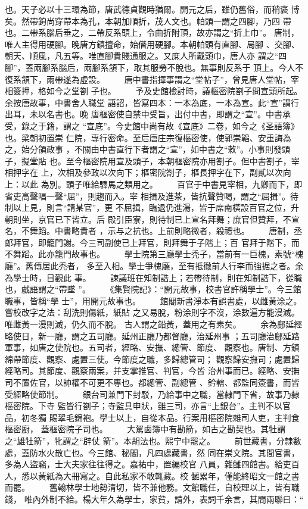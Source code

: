 \documentclass{ctexart}
\begin{document}
也。天子必以十三環為節，唐武德貞觀時猶爾。開元之后，雖仍舊俗，而稍褒 博矣。然帶鉤尚穿帶本為孔，本朝加順折，茂人文也。帕頭一謂之四腳，乃四 帶也。二帶系腦后垂之，二帶反系頭上，令曲折附頂，故亦謂之``折上巾''。 唐制，唯人主得用硬腳。晚唐方鎮擅命，始僭用硬腳。本朝帕頭有直腳、局腳 、交腳、朝天、順風，凡五等。唯直腳貴賤通服之。又庶人所戴頭巾，唐人亦 謂之``四腳''，蓋兩腳系腦后，兩腳系頷下，取其服勞不脫也。無事則反系于 頂上。今人不復系頷下，兩帶遂為虛設。 　　唐中書指揮事謂之``堂帖子''，曾見唐人堂帖，宰相簽押，格如今之堂劄 子也。 　　予及史館檢討時，議樞密院劄子問宣頭所起。余按唐故事，中書舍人職堂 語詔，皆寫四本：一本為底，一本為宣。此``宣''謂行出耳，未以名書也。晚 唐樞密使自禁中受旨，出付中書，即謂之``宣''。中書承受，錄之于籍，謂之 ``宣底''。今史館中尚有故《宣底》二卷，如今之《圣語簿》也。梁朝初置崇 仁院，專行密命。至后唐庄宗復樞密使，使郭崇韜、安重誨為之，始分領政事 ，不關由中書直行下者謂之``宣''，如中書之``敕''。小事則發頭子，擬堂貼 也。至今樞密院用宣及頭子，本朝樞密院亦用劄子。但中書劄子，宰相押字在 上，次相及參政以次向下；樞密院劄子，樞長押字在下，副貳以次向上：以此 為別。頭子唯給驛馬之類用之。 　　百官于中書見宰相，九卿而下，即省吏高聲唱一聲``屈''，則趨而入。宰 相揖及進茶，皆抗聲贊喝，謂之``屈揖''。待制以上見，則言``請某官''，更 不屈揖，臨退仍進湯，皆于席南橫設百官之位，升朝則坐，京官已下皆立。后 殿引臣寮，則待制已上宣名拜舞；庶官但贊拜，不宣名，不舞蹈。中書略貴者 ，示与之抗也。上前則略微者，殺禮也。 　　唐制，丞郎拜官，即籠門謝。今三司副使已上拜官，則拜舞于子階上；百 官拜于階下，而不舞蹈。此亦籠門故事也。 　　學士院第三廳學士秃子，當前有一巨槐，素號``槐廳''。舊傳居此秃者， 多至入相。學士爭槐廳，至有抵徹前人行李而強据之者。余為學士時，目觀此 事。 　　諫議班在知制誥上；若帶待制，則在知制誥下，從職也，戲語謂之``帶墜 ''。 　　《集賢院記》：``開元故事，校書官許稱學士''。今三館職事，皆稱``學 士''，用開元故事也。 　　館閣新書淨本有誤書處，以雌黃涂之。嘗校改字之法：刮洗則傷紙，紙貼 之又易脫，粉涂則字不沒，涂數遍方能漫滅。唯雌黃一漫則滅，仍久而不脫。 古人謂之鉛黃，蓋用之有素矣。 　　余為鄜延經略使日，新一廳，謂之五司廳。延州正廳乃都督廳，治延州事 ；五司廳治鄜延路軍事，如唐之使院也。五司者，經略、安撫、總管、節度、 觀察也。唐制、方鎮綿帶節度、觀察、處置三使。今節度之職，多歸總管司； 觀察歸安撫司；處置歸經略司。其節度、觀察兩案，并支掌推官、判官，今皆 治州事而已。經略、安撫司不置佐官，以帥權不可更不專也。都總管、副總管 、鈐轄、都監同簽書，而皆受經略使節制。 　　銀台司兼門下封駁，乃給事中之職，當隸門下省，故事乃隸樞密院。下寺 監皆行劄子；寺監具申狀，雖三司，亦言``上銀台''。主判不以官品，初冬獨 賜翠毛錦袍。學士以上，自從本品。行案用樞密院雜司人吏，主判食樞密廚， 蓋樞密院子司也。 　　大駕鹵簿中有勘箭，如古之勘契也。其牡謂之``雄牡箭''，牝謂之``辟仗 箭''。本胡法也。熙宁中罷之。 　　前世藏書，分隸數處，蓋防水火散亡也。今三館、秘閣，凡四處藏書，然 同在崇文院。其間官書，多為人盜竊，士大夫家往往得之。嘉祐中，置編校官 八員，雜讎四館書。給吏百人，悉以黃紙為大冊寫之。自此私家不敢輒藏。校 讎累年，僅能終昭文一館之書而罷。 　　舊翰林學士地勢清切，皆不兼他務。文館職任，自校理以上，皆有職錢， 唯內外制不給。楊大年久為學士，家貧，請外，表詞千余言，其間兩聯曰：`` 
\end{document}
